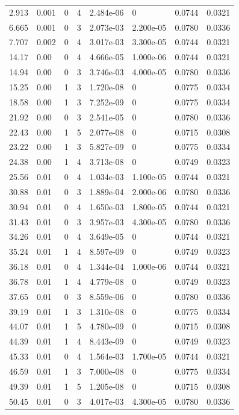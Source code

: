 \documentclass[preview]{standalone}
\begin{document}
{{\begin{tabular}{L{1.2cm}C{1.2cm} C{0.3cm}C{0.5cm} C{1.4cm}C{1.4cm} C{1.4cm}C{1.4cm}}
  2.913  &  0.001  & 0     &  4 &  2.484e-06  & 0  & 0.0744 &  0.0321   \\ 
  6.665  &  0.001  & 0     &  3 &  2.073e-03  & 2.200e-05  & 0.0780 &  0.0336   \\ 
  7.707  &  0.002  & 0     &  4 &  3.017e-03  & 3.300e-05  & 0.0744 &  0.0321   \\ 
  14.17  &  0.00  & 0     &  4 &  4.666e-05  & 1.000e-06  & 0.0744 &  0.0321   \\ 
  14.94  &  0.00  & 0     &  3 &  3.746e-03  & 4.000e-05  & 0.0780 &  0.0336   \\ 
  15.25  &  0.00  & 1     &  3 &  1.720e-08  & 0  & 0.0775 &  0.0334   \\ 
  18.58  &  0.00  & 1     &  3 &  7.252e-09  & 0  & 0.0775 &  0.0334   \\ 
  21.92  &  0.00  & 0     &  3 &  2.541e-05  & 0  & 0.0780 &  0.0336   \\ 
  22.43  &  0.00  & 1     &  5 &  2.077e-08  & 0  & 0.0715 &  0.0308   \\ 
  23.22  &  0.00  & 1     &  3 &  5.827e-09  & 0  & 0.0775 &  0.0334   \\ 
  24.38  &  0.00  & 1     &  4 &  3.713e-08  & 0  & 0.0749 &  0.0323   \\ 
  25.56  &  0.01  & 0     &  4 &  1.034e-03  & 1.100e-05  & 0.0744 &  0.0321   \\ 
  30.88  &  0.01  & 0     &  3 &  1.889e-04  & 2.000e-06  & 0.0780 &  0.0336   \\ 
  30.94  &  0.01  & 0     &  4 &  1.650e-03  & 1.800e-05  & 0.0744 &  0.0321   \\ 
  31.43  &  0.01  & 0     &  3 &  3.957e-03  & 4.300e-05  & 0.0780 &  0.0336   \\ 
  34.26  &  0.01  & 0     &  4 &  3.649e-05  & 0  & 0.0744 &  0.0321   \\ 
  35.24  &  0.01  & 1     &  4 &  8.597e-09  & 0  & 0.0749 &  0.0323   \\ 
  36.18  &  0.01  & 0     &  4 &  1.344e-04  & 1.000e-06  & 0.0744 &  0.0321   \\ 
  36.78  &  0.01  & 1     &  4 &  4.779e-08  & 0  & 0.0749 &  0.0323   \\ 
  37.65  &  0.01  & 0     &  3 &  8.559e-06  & 0  & 0.0780 &  0.0336   \\ 
  39.19  &  0.01  & 1     &  3 &  1.310e-08  & 0  & 0.0775 &  0.0334   \\ 
  44.07  &  0.01  & 1     &  5 &  4.780e-09  & 0  & 0.0715 &  0.0308   \\ 
  44.39  &  0.01  & 1     &  4 &  8.443e-09  & 0  & 0.0749 &  0.0323   \\ 
  45.33  &  0.01  & 0     &  4 &  1.564e-03  & 1.700e-05  & 0.0744 &  0.0321   \\ 
  46.59  &  0.01  & 1     &  3 &  7.000e-08  & 0  & 0.0775 &  0.0334   \\ 
  49.39  &  0.01  & 1     &  5 &  1.205e-08  & 0  & 0.0715 &  0.0308   \\ 
  50.45  &  0.01  & 0     &  3 &  4.017e-03  & 4.300e-05  & 0.0780 &  0.0336   \\ 
\hline 
\end{tabular} 

}}
\end{document}
